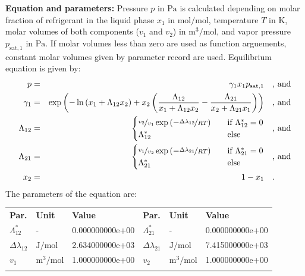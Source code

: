 \textbf{Equation and parameters:}
\newline
%
Pressure $p$ in $\si{\pascal}$ is calculated depending on molar fraction of refrigerant in the liquid phase $x_1$ in $\si{\mole\per\mole}$, temperature $T$ in $\si{\kelvin}$, molar volumes of both components ($v_1$ and $v_2$) in $\si{\cubic\meter\per\mole}$, and vapor pressure $p_\mathrm{sat,1}$ in $\si{\pascal}$. If molar volumes less than zero are used as function arguements, constant molar volumes given by parameter record are used. Equilibrium equation is given by:
%
\begin{equation*}
\begin{split}
p &=& \gamma_1 x_1 p_\mathrm{sat,1} & \quad\text{, and} \\
\gamma_1 &=& \exp \left( - \ln \left( x_1 + \Lambda_{12} x_2 \right) + x_2 \left( \frac{\Lambda_{12}}{x_1 + \Lambda_{12} x_2} - \frac{\Lambda_{21}}{x_2 + \Lambda_{21} x_1} \right) \right) & \quad\text{, and} \\
\Lambda_{12} &=& \begin{cases} \nicefrac{v_2}{v_1} \exp \left( - \nicefrac{\Delta\lambda_{12}}{R T} \right) & \quad \text{if } \Lambda_{12}^{*} = 0 \\ \Lambda_{12}^{*}  & \quad \text{else} \end{cases}  & \quad\text{, and} \\
\Lambda_{21} &=& \begin{cases} \nicefrac{v_1}{v_2} \exp \left( - \nicefrac{\Delta\lambda_{21}}{R T} \right) & \quad \text{if } \Lambda_{21}^{*} = 0 \\ \Lambda_{21}^{*}  & \quad \text{else} \end{cases}  & \quad\text{, and} \\
x_2 &=& 1 - x_1  & \quad\text{.} \\
\end{split}
\end{equation*}
%
The parameters of the equation are:
%
\begin{longtable}[l]{lll|lll}
\toprule
\addlinespace
\textbf{Par.} & \textbf{Unit} & \textbf{Value} &	\textbf{Par.} & \textbf{Unit} & \textbf{Value} \\
\addlinespace
\midrule
\endhead

\bottomrule
\endfoot
\bottomrule
\endlastfoot
\addlinespace

$\Lambda_{12}^{*}$ & - & 0.000000000e+00 & $\Lambda_{21}^{*}$ & - & 0.000000000e+00 \\
$\Delta\lambda_{12}$ & $\si{\joule\per\mole}$ & 2.634000000e+03 & $\Delta\lambda_{21}$ & $\si{\joule\per\mole}$ & 7.415000000e+03 \\
$v_1$ & $\si{\cubic\meter\per\mole}$ & 1.000000000e+00 & $v_2$ & $\si{\cubic\meter\per\mole}$ & 1.000000000e+00 \\

\addlinespace\end{longtable}

